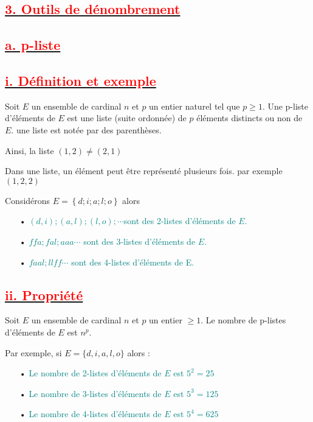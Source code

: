 \documentclass[12pt]{article}
\begin{document}
\subsection*{\underline{\textbf{\textcolor{red}{3. Outils de dénombrement}}}}
\subsection*{\underline{\textbf{\textcolor{red}{a. p-liste}}}}
\subsection*{\underline{\textbf{\textcolor{red}{i. Définition et exemple }}}}
Soit $E$ un ensemble de cardinal $n$ et $p$ un entier naturel tel que $p \geq 1$. Une p-liste d’éléments de $E$ est une liste (suite ordonnée) de $p$ éléments distincts ou non de $E.$
une liste est notée par des parenthèses.

Ainsi, la liste $(1,2)\neq (2,1)$

Dans une liste, un élément peut être représenté plusieurs fois. par exemple $(1,2,2)$

Considérons $E = \left\lbrace d; i; a ; l ; o\right\rbrace $ alors

\begin{itemize}
\item[•] \textcolor{teal}{$(d,i); (a,l) ; (l,o) ;\cdots$sont des 2-listes d’éléments de $E$.}
\item[•] \textcolor{teal}{$ffa ; fal ;aaa\cdots$ sont des 3-listes d’éléments de $E$.}
\item[•] \textcolor{teal}{$faal ; llff\cdots$ sont des 4-listes d’éléments de E.}
\end{itemize}
\subsection*{\underline{\textbf{\textcolor{red}{ii. Propriété}}}}
Soit \(E\) un ensemble de cardinal \(n\) et \(p\) un entier \(\geq 1\). Le nombre de p-listes d’éléments de \(E\) est \(n^{p}\).

Par exemple, si \(E = \{d, i,  a, l , o\}\) alors :
\begin{itemize}
    \item[•] \textcolor{teal}{Le nombre de 2-listes d’éléments de \(E\) est \(5^{2} = 25\)}
    \item[•] \textcolor{teal}{Le nombre de 3-listes d’éléments de \(E\) est \(5^{3} = 125\)}
    \item[•] \textcolor{teal}{Le nombre de 4-listes d’éléments de \(E\) est \(5^{4} = 625\)}
\end{itemize}
\end{document}
